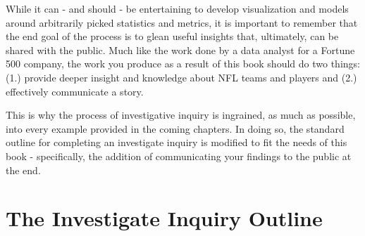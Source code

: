 \documentclass[
  letterpaper,
]{krantz}
\begin{document}
While it can - and should - be entertaining to develop visualization and
models around arbitrarily picked statistics and metrics, it is important
to remember that the end goal of the process is to glean useful insights
that, ultimately, can be shared with the public. Much like the work done
by a data analyst for a Fortune 500 company, the work you produce as a
result of this book should do two things: (1.) provide deeper insight
and knowledge about NFL teams and players and (2.) effectively
communicate a story.

This is why the process of investigative inquiry is ingrained, as much
as possible, into every example provided in the coming chapters. In
doing so, the standard outline for completing an investigate inquiry is
modified to fit the needs of this book - specifically, the addition of
communicating your findings to the public at the end.

\hypertarget{the-investigate-inquiry-outline}{%
\section{The Investigate Inquiry
Outline}\label{the-investigate-inquiry-outline}}
\end{document}

